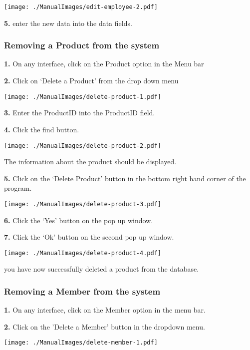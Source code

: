 \texttt{[image: ./ManualImages/edit-employee-2.pdf]}

\textbf{5.} enter the new data into the data fields.

\pagebreak
\subsubsection{Removing a Product from the system}
\label{fig:Removing a Product from the system}

\textbf{1.} On any interface, click on the Product option in the Menu bar

\textbf{2.} Click on `Delete a Product' from the drop down menu

\texttt{[image: ./ManualImages/delete-product-1.pdf]}

\textbf{3.} Enter the ProductID into the ProductID field.

\textbf{4.} Click the find button.

\texttt{[image: ./ManualImages/delete-product-2.pdf]}

The information about the product should be displayed.

\textbf{5.} Click on the `Delete Product' button in the bottom right hand corner of the program.

\texttt{[image: ./ManualImages/delete-product-3.pdf]}

\textbf{6.} Click the `Yes' button on the pop up window.

\textbf{7.} Click the `Ok' button on the second pop up window.

\texttt{[image: ./ManualImages/delete-product-4.pdf]}

you have now successfully deleted a product from the database.

\pagebreak
\subsubsection{Removing a Member from the system}
\label{fig:Removing a Member from the system}

\textbf{1.} On any interface, click on the Member option in the menu bar.

\textbf{2.} Click on the 'Delete a Member' button in the dropdown menu.

\texttt{[image: ./ManualImages/delete-member-1.pdf]}

\pagebreak

